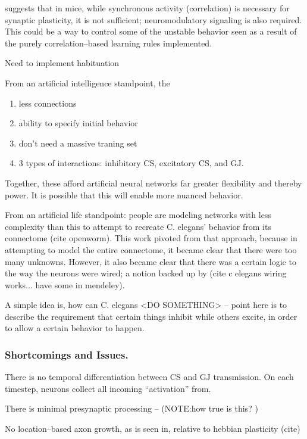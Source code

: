 \documentclass[letterpaper]{article}
\begin{document}
\cite{Johansens2014} suggests that in mice, while synchronous activity (correlation) is necessary for synaptic plasticity, it is not sufficient; neuromodulatory signaling is also required. This could be a way to control some of the unstable behavior seen as a result of the purely correlation--based learning rules implemented.


Need to implement habituation 

From an artificial intelligence standpoint, the

\begin{enumerate}
\item less connections
\item ability to specify initial behavior
\item don't need a massive traning set
\item 3 types of interactions: inhibitory CS, excitatory CS, and GJ.
\end{enumerate}

Together, these afford artificial neural networks far greater flexibility and thereby power. It is possible that this will enable more nuanced behavior.

From an artificial life standpoint: people are modeling networks with less complexity than this to attempt to recreate C. elegans' behavior from its connectome (cite openworm). This work pivoted from that approach, because in attempting to model the entire connectome, it became clear that there were too many unknowns. However, it also became clear that there was a certain logic to the way the neurons were wired; a notion backed up by (cite c elegans wiring works... have some in mendeley).

A simple idea is, how can C. elegans <DO SOMETHING> -- point here is to describe the requirement that certain things inhibit while others excite, in order to allow a certain behavior to happen.

\subsubsection{Shortcomings and Issues.}
There is no temporal differentiation between CS and GJ transmission. On each timestep, neurons collect all incoming ``activation'' from.

There is minimal presynaptic processing -- (NOTE:how true is this? )

No location--based axon growth, as is seen in, relative to hebbian plasticity (cite)
\end{document}
